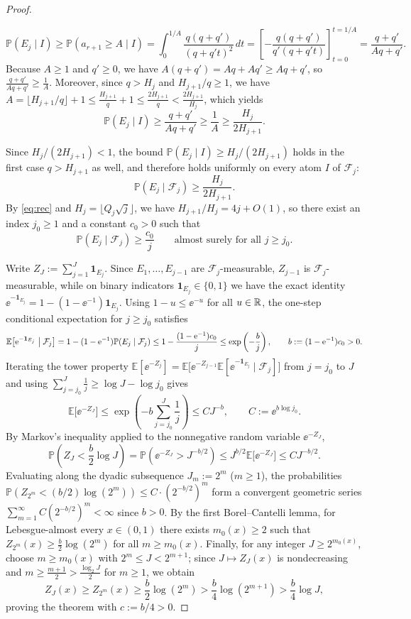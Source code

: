 \begin{proof}
\begin{itemize}[leftmargin=1.8em]
\[
\mathbb P(E_j\mid I)\ge\mathbb P(a_{r+1}\ge A\mid I)
=\int_0^{1/A}\frac{q(q+q')}{(q+q't)^2}\,dt
=\left[-\frac{q(q+q')}{q'(q+q't)}\right]_{t=0}^{t=1/A}
=\frac{q+q'}{Aq+q'}.
\]
Because $A\ge1$ and $q'\ge0$, we have $A(q+q')=Aq+Aq'\ge Aq+q'$, so
$\frac{q+q'}{Aq+q'}\ge\frac1A$. Moreover, since $q>H_j$ and $H_{j+1}/q\ge1$, we
have $A=\lfloor H_{j+1}/q\rfloor+1\le\frac{H_{j+1}}{q}+1\le\frac{2H_{j+1}}{q}<\frac{2H_{j+1}}{H_j}$,
which yields
\[
\mathbb P(E_j\mid I)\ge\frac{q+q'}{Aq+q'}\ge\frac1A\ge\frac{H_j}{2H_{j+1}}.
\]
\end{itemize}
Since $H_j/(2H_{j+1})<1$, the bound $\mathbb P(E_j\mid I)\ge H_j/(2H_{j+1})$
holds in the first case $q>H_{j+1}$ as well, and therefore holds uniformly on
every atom $I$ of $\mathcal F_j$:
\[
\mathbb P(E_j\mid\mathcal F_j)\ge\frac{H_j}{2H_{j+1}}.
\]
By \eqref{eq:rec} and $H_j=\lfloor Q_j\sqrt j\rfloor$, we have
$H_{j+1}/H_j=4j+O(1)$, so there exist an index $j_0\ge1$ and a constant
$c_0>0$ such that
\[
\mathbb P(E_j\mid\mathcal F_j)\ge\frac{c_0}{j}\qquad\text{almost surely for all }j\ge j_0.
\]

Write $Z_J:=\sum_{j=1}^J\mathbf 1_{E_j}$. Since $E_1,\dots,E_{j-1}$ are
$\mathcal F_j$-measurable, $Z_{j-1}$ is $\mathcal F_j$-measurable, while on binary
indicators $\mathbf 1_{E_j}\in\{0,1\}$ we have the exact identity
$\ee^{-\mathbf 1_{E_j}}=1-(1-\ee^{-1})\mathbf 1_{E_j}$. Using $1-u\le\ee^{-u}$
for all $u\in\mathbb{R}$, the one-step conditional expectation for $j\ge j_0$ satisfies
\[
\mathbb E\bigl[\mathrm{e}^{-\mathbf 1_{E_j}}\bigm|\mathcal F_j\bigr]
=1-(1-\mathrm{e}^{-1})\mathbb P(E_j\mid\mathcal F_j)
\le 1-\frac{(1-\mathrm{e}^{-1})c_0}{j}
\le\exp\left(-\frac{b}{j}\right),\qquad b:=(1-\mathrm{e}^{-1})c_0>0.
\]
Iterating the tower property $\mathbb E[\ee^{-Z_j}]=\mathbb E\bigl[\ee^{-Z_{j-1}}\mathbb E[\ee^{-\mathbf 1_{E_j}}\mid\mathcal F_j]\bigr]$
from $j=j_0$ to $J$ and using $\sum_{j=j_0}^J\frac1j\ge\log J-\log j_0$ gives
\[
\mathbb E\bigl[\ee^{-Z_J}\bigr]
\le\exp\left(-b\sum_{j=j_0}^J\frac1j\right)
\le C J^{-b},\qquad C:=\ee^{b\log j_0}.
\]
By Markov's inequality applied to the nonnegative random variable $\ee^{-Z_J}$,
\[
\mathbb P\left(Z_J<\frac{b}{2}\log J\right)
=\mathbb P\left(\ee^{-Z_J}>J^{-b/2}\right)
\le J^{b/2}\mathbb E\bigl[\ee^{-Z_J}\bigr]
\le C J^{-b/2}.
\]
Evaluating along the dyadic subsequence $J_m:=2^m$ ($m\ge1$), the probabilities
$\mathbb P(Z_{2^m}<(b/2)\log(2^m))\le C\cdot(2^{-b/2})^m$ form a convergent
geometric series $\sum_{m=1}^\infty C(2^{-b/2})^m<\infty$ since $b>0$. By the
first Borel--Cantelli lemma, for Lebesgue-almost every $x\in(0,1)$ there exists
$m_0(x)\ge2$ such that $Z_{2^m}(x)\ge\frac{b}{2}\log(2^m)$ for all
$m\ge m_0(x)$. Finally, for any integer $J\ge 2^{m_0(x)}$, choose $m\ge m_0(x)$
with $2^m\le J<2^{m+1}$; since $J\mapsto Z_J(x)$ is nondecreasing and
$m\ge\frac{m+1}{2}>\frac{\log_2 J}{2}$ for $m\ge1$, we obtain
\[
Z_J(x)\ge Z_{2^m}(x)\ge\frac{b}{2}\log(2^m)>\frac{b}{4}\log(2^{m+1})>\frac{b}{4}\log J,
\]
proving the theorem with $c:=b/4>0$.
\end{proof}

